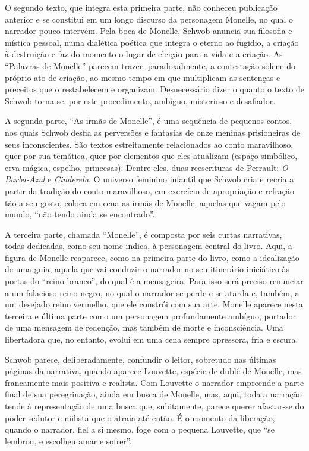 O segundo texto, que integra esta primeira parte, não conheceu publicação
anterior e se constitui em um longo discurso da personagem Monelle, no qual o
narrador pouco intervém. Pela boca de Monelle, Schwob anuncia sua filosofia e
mística pessoal, numa dialética poética que integra o eterno ao fugidio, a
criação à destruição e faz do momento o lugar de eleição para a vida e a
criação. As ``Palavras de Monelle'' parecem trazer, paradoxalmente, a
contestação solene do próprio ato de criação, ao mesmo tempo em que multiplicam
as sentenças e preceitos que o restabelecem e organizam. Desnecessário dizer o
quanto o texto de Schwob torna-se, por este procedimento, ambíguo, misterioso e
desafiador.

A segunda parte, ``As irmãs de Monelle'', é uma sequência de pequenos
contos, nos quais Schwob desfia as perversões e fantasias de onze meninas
prisioneiras de seus inconscientes. São textos estreitamente relacionados ao
conto maravilhoso, quer por sua temática, quer por elementos que eles atualizam
(espaço simbólico, erva mágica, espelho, princesas). Dentre eles, duas
reescrituras de Perrault: \textit{O Barba-Azul} e \textit{Cinderela}. O
universo feminino infantil que Schwob cria e recria a partir da tradição do
conto maravilhoso, em exercício de apropriação e refração tão a seu gosto,
coloca em cena as irmãs de Monelle, aquelas que vagam pelo mundo, “não tendo
ainda se encontrado”. 

A terceira parte, chamada ``Monelle'', é composta por seis curtas
narrativas, todas dedicadas, como seu nome indica, à personagem central do
livro. Aqui, a figura de Monelle reaparece, como na
primeira parte do livro, como a idealização de uma guia, aquela que vai conduzir
o narrador no seu itinerário iniciático às portas do “reino branco”, do qual é
a mensageira. Para isso será preciso renunciar a um falacioso reino negro, no
qual o narrador se perde e se atarda e, também, a um desejado reino vermelho,
que ele constrói com sua arte. Monelle aparece nesta terceira e última parte
como um personagem profundamente ambíguo, portador de uma mensagem de redenção,
mas também de morte e inconsciência. Uma libertadora que, no entanto, evolui em
uma cena sempre opressora, fria e escura.

Schwob parece, deliberadamente, confundir o leitor, sobretudo nas últimas
páginas da narrativa, quando aparece Louvette, espécie de dublê de Monelle, mas
francamente mais positiva e realista. Com Louvette o narrador empreende a parte
final de sua peregrinação, ainda em busca de Monelle, mas, aqui, toda a
narração tende à representação de uma busca que, subitamente, parece querer
afastar-se do poder sedutor e niilista que o atraía até então. É o momento da
liberação, quando o narrador, fiel a si mesmo, foge com a pequena Louvette, que
“se lembrou, e escolheu amar e sofrer”.

